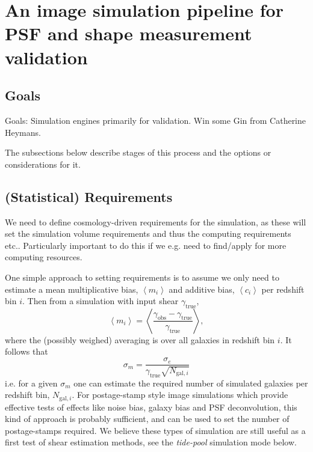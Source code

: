 \documentclass[\docopts]{\docclass}
\begin{document}
\section{An image simulation pipeline for PSF and shape measurement validation}


\subsection{Goals}
Goals: Simulation engines primarily for validation. Win some Gin from Catherine Heymans.

The subsections below describe stages of this process and the options or considerations for it.

\subsection{(Statistical) Requirements}

We need to define cosmology-driven requirements for the simulation, as these will set the simulation volume requirements and thus the computing requirements etc.. Particularly important to do this if we e.g. need to find/apply for more computing resources. 

One simple approach to setting requirements is to assume we only need to estimate a mean multiplicative bias, $\left<m_i\right>$ and additive bias, $\left<c_i\right>$ per redshift bin $i$. Then from a simulation with input shear $\gamma_{\mathrm{true}}$, 
\begin{equation}
\left<m_i\right> = \left<\frac{\gamma_{\mathrm{obs}}-\gamma_{\mathrm{true}}}{\gamma_{\mathrm{true}}}\right>,
\end{equation}
where the (possibly weighed) averaging is over all galaxies in redshift bin $i$. It follows that
\begin{equation}
\sigma_m = \frac{\sigma_e}{\gamma_{\mathrm{true}} \sqrt{N_{\mathrm{gal},i}}}
\end{equation}
i.e. for a given $\sigma_m$ one can estimate the required number of simulated galaxies per redshift bin, $N_{\mathrm{gal},i}$.
For postage-stamp style image simulations which provide effective tests of effects like noise bias, galaxy bias and PSF deconvolution, this kind of approach is probably sufficient, and can be used to set the number of postage-stamps required. We believe these types of simulation are still useful as a first test of shear estimation methods, see the \emph{tide-pool} simulation mode below.
\end{document}
